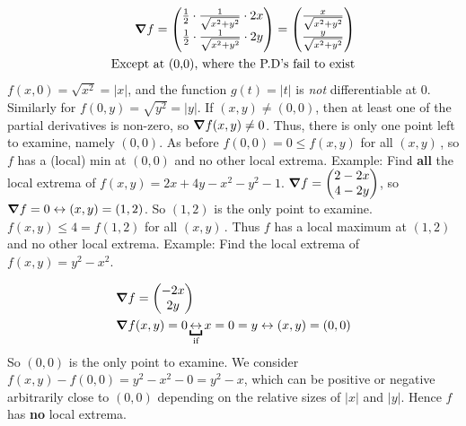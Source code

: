 \documentclass{article}
\newcommand{\n}{\leavevmode \newline} %
\newcommand{\nn}{\leavevmode \newline \newline} %
\newcommand{\xy}{$(x,y)\,$} %
\numberwithin{equation}{subsection} %
\begin{document}
\begin{equation}
    \begin{split}
        \grad f = 
        \begin{pmatrix}
            \frac{1}{2}\cdot\frac{1}{\sqrt{x^2+y^2}}\cdot 2x \\
            \frac{1}{2}\cdot\frac{1}{\sqrt{x^2+y^2}}\cdot 2y
        \end{pmatrix}
        =
        \begin{pmatrix}
            \frac{x}{\sqrt{x^2+y^2}} \\
            \frac{y}{\sqrt{x^2+y^2}}
        \end{pmatrix}
        \\
        \text{Except at (0,0), where the P.D's fail to exist}
    \end{split}
\end{equation}
\n
$f(x,0)=\sqrt{x^2}=|x|$, and the function $g(t)=|t|$ is \textit{not} differentiable at 0. Similarly for $f(0,y)=\sqrt{y^2}=|y|$. If $(x,y)\neq(0,0)$, then at least one of the partial derivatives is non-zero,  so $\grad f(x,y)\neq 0$. Thus, there is only one point left to examine, namely $(0,0)$. As before $f(0,0)=0\leq f(x,y)$ for all \xy, so $f$ has a (local) min at $(0,0)$ and no other local extrema.
\nn
Example: Find \textbf{all} the local extrema of $f(x,y)=2x+4y-x^2-y^2-1$.
$
    \grad f = 
    \begin{pmatrix}
        2-2x \\ 4-2y
    \end{pmatrix}
$, so $\grad f=0 \leftrightarrow (x,y)=(1,2)$. So $(1,2)$ is the only point to examine. $f(x,y)\leq4=f(1,2)$ for all \xy. Thus $f$ has a local maximum at $(1,2)$ and no other local extrema.
\nn
Example: Find the local extrema of $f(x,y) = y^2 - x^2$.

\begin{equation}
    \begin{split}
        &\grad f = 
        \begin{pmatrix}
            -2x \\ 2y
        \end{pmatrix}
        \\
        &\grad f(x,y) = 0 \underbracket{\leftrightarrow}_{\text{if}} x=0=y \leftrightarrow (x,y) = (0,0)
    \end{split}
\end{equation}
So $(0,0)$ is the only point to examine. We consider $f(x,y)-f(0,0) = y^2 - x^2 - 0 = y^2 - x$, which can be positive or negative arbitrarily close to $(0,0)$ depending on the relative sizes of $|x|$ and $|y|$. Hence $f$ has \textbf{no} local extrema.
\end{document}
